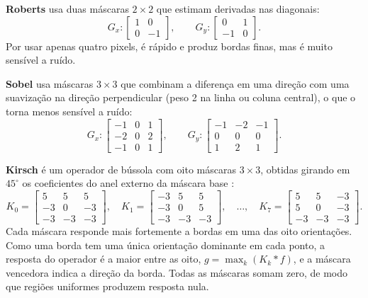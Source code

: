 \documentclass[11pt,a4paper]{article}
\begin{document}
\textbf{Roberts} usa duas máscaras $2 \times 2$ que estimam derivadas nas diagonais:
\begin{equation}
  G_x: \begin{bmatrix} 1 & 0 \\ 0 & -1 \end{bmatrix}, \qquad
  G_y: \begin{bmatrix} 0 & 1 \\ -1 & 0 \end{bmatrix}.
\end{equation}
Por usar apenas quatro pixels, é rápido e produz bordas finas, mas é muito sensível a ruído.

\textbf{Sobel} usa máscaras $3 \times 3$ que combinam a diferença em uma direção com uma
suavização na direção perpendicular (peso 2 na linha ou coluna central), o que o torna
menos sensível a ruído:
\begin{equation}
  G_x: \begin{bmatrix} -1 & 0 & 1 \\ -2 & 0 & 2 \\ -1 & 0 & 1 \end{bmatrix}, \qquad
  G_y: \begin{bmatrix} -1 & -2 & -1 \\ 0 & 0 & 0 \\ 1 & 2 & 1 \end{bmatrix}.
\end{equation}

\textbf{Kirsch} é um operador de bússola com oito máscaras $3 \times 3$, obtidas girando em
$45^\circ$ os coeficientes do anel externo da máscara base \cite{kirsch}:
\begin{equation}
  K_0 = \begin{bmatrix} 5 & 5 & 5 \\ -3 & 0 & -3 \\ -3 & -3 & -3 \end{bmatrix}, \quad
  K_1 = \begin{bmatrix} -3 & 5 & 5 \\ -3 & 0 & 5 \\ -3 & -3 & -3 \end{bmatrix}, \quad
  \dots, \quad
  K_7 = \begin{bmatrix} 5 & 5 & -3 \\ 5 & 0 & -3 \\ -3 & -3 & -3 \end{bmatrix}.
\end{equation}
Cada máscara responde mais fortemente a bordas em uma das oito orientações. Como uma borda
tem uma única orientação dominante em cada ponto, a resposta do operador é a maior entre as
oito, $g = \max_k (K_k * f)$, e a máscara vencedora indica a direção da borda. Todas as
máscaras somam zero, de modo que regiões uniformes produzem resposta nula.
\end{document}
